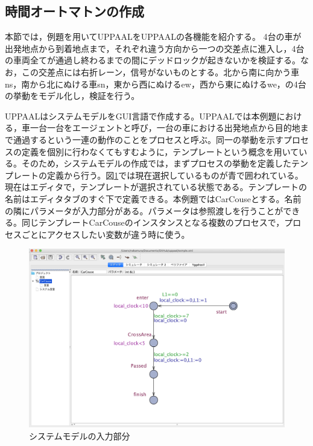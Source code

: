 \documentclass{tpu-sotu}
\begin{document}
	\subsection{時間オートマトンの作成}
	本節では，例題を用いてUPPAALをUPPAALの各機能を紹介する。
	4台の車が出発地点から到着地点まで，それぞれ違う方向から一つの交差点に進入し，4台の車両全てが通過し終わるまでの間にデッドロックが起きないかを検証する。なお，この交差点には右折レーン，信号がないものとする。北から南に向かう車ns，南から北にぬける車sn，東から西にぬけるew，西から東にぬけるwe，の4台の挙動をモデル化し，検証を行う。
	
	UPPAALはシステムモデルをGUI言語で作成する。UPPAALでは本例題における，車一台一台をエージェントと呼び，一台の車における出発地点から目的地まで通過するという一連の動作のことをプロセスと呼ぶ。同一の挙動を示すプロセスの定義を個別に行わなくてもすむように，テンプレートという概念を用いている。そのため，システムモデルの作成では，まずプロセスの挙動を定義したテンプレートの定義から行う。図\ref{CC}では現在選択しているものが青で囲われている。現在はエディタで，テンプレートが選択されている状態である。テンプレートの名前はエディタタブのすぐ下で定義できる。本例題ではCarCouseとする。名前の隣にパラメータが入力部分がある。パラメータは参照渡しを行うことができる。同じテンプレートCarCouseのインスタンスとなる複数のプロセスで，プロセスごとにアクセスしたい変数が違う時に使う。
	\begin{figure}[htbp]
	\centering
	\includegraphics[width=145mm]{CarCouse.png}
	\caption{システムモデルの入力部分}
	\label{CC}
	\end{figure}
	
\end{document}
